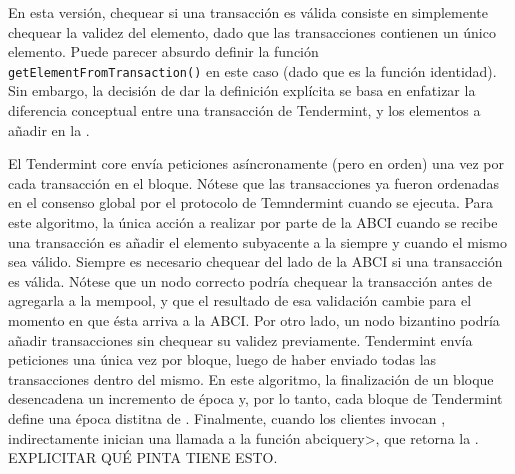 %

En esta versión, chequear si una transacción es válida consiste en simplemente chequear
la validez del elemento, dado que las transacciones contienen un único elemento.
%
Puede parecer absurdo definir la función \texttt{getElementFromTransaction()}
en este caso (dado que es la función identidad). Sin embargo, la decisión de dar
la definición explícita se basa en enfatizar la diferencia conceptual entre una
transacción de Tendermint, y los elementos a añadir en la \setchain.
%

El Tendermint core envía peticiones \DeliverTx asíncronamente (pero en orden)
una vez por cada transacción en el bloque.
%
Nótese que las transacciones ya fueron ordenadas en el consenso global por el protocolo
de Temndermint cuando \DeliverTx se ejecuta.
%
Para este algoritmo, la única acción a realizar por parte de la ABCI cuando se recibe una
transacción es añadir el elemento subyacente a la \setchain siempre y cuando el mismo
sea válido.
%
Siempre es necesario chequear del lado de la ABCI si una transacción es válida.
%
Nótese que un nodo correcto podría chequear la transacción antes de agregarla a la
mempool,
y que el resultado de esa validación cambie para el momento en que ésta arriva a la
ABCI.
%
Por otro lado, un nodo bizantino podría añadir transacciones sin chequear
su validez previamente.
%
Tendermint envía peticiones \EndBlock una única vez por bloque, luego de haber
enviado todas las transacciones dentro del mismo.
%
En este algoritmo, la finalización de un bloque desencadena un incremento de época
y, por lo tanto, cada bloque de Tendermint define una época distitna de \setchain.
%
Finalmente, cuando los clientes invocan \Get, indirectamente inician una llamada
a la función \<abciquery>, que retorna la \setchain. EXPLICITAR QUÉ PINTA TIENE ESTO.

